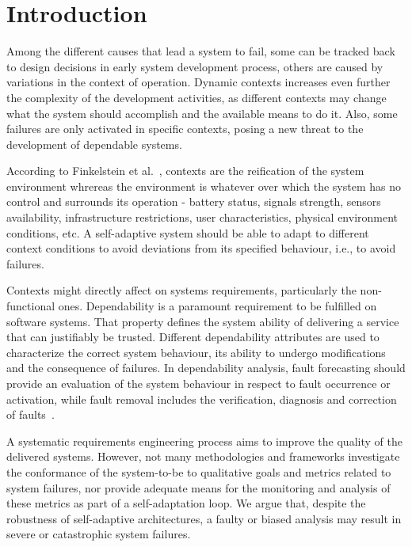 \chapter{Introduction}\label{ch_introduction}%

Among the different causes that lead a system to fail, some can be tracked back to design decisions in early system development process, others are caused by variations in the context of operation. Dynamic contexts increases even further the complexity of the development activities, as different contexts may change what the system should accomplish and the available means to do it. Also, some failures are only activated in specific contexts, posing a new threat to the development of dependable systems.

According to Finkelstein et al.~\cite{Andrea01aframework}, contexts are the reification of the system environment whrereas the environment is whatever over which the system has no control and surrounds its operation - battery status, signals strength, sensors availability, infrastructure restrictions, user characteristics, physical environment conditions, etc. A self-adaptive system should be able to adapt to different context conditions to avoid deviations from its specified behaviour, i.e., to avoid failures.

Contexts might directly affect on systems requirements, particularly the non-functional ones. Dependability is a paramount requirement to be fulfilled on software systems. That property defines the system ability of delivering a service that can justifiably be trusted. Different dependability attributes are used to characterize the correct system behaviour, its ability to undergo modifications and the consequence of failures. In dependability analysis, fault forecasting should provide an evaluation of the system behaviour in respect to fault occurrence or activation, while fault removal includes the verification, diagnosis and correction of faults~\cite{Laprie2004}. 

A systematic requirements engineering process aims to improve the quality of the delivered systems. However, not many methodologies and frameworks investigate the conformance of the system-to-be to qualitative goals and metrics related to system failures, nor provide adequate means for the monitoring and analysis of these metrics as part of a self-adaptation loop. We argue that, despite the robustness of self-adaptive architectures, a faulty or biased analysis may result in severe or catastrophic system failures.


